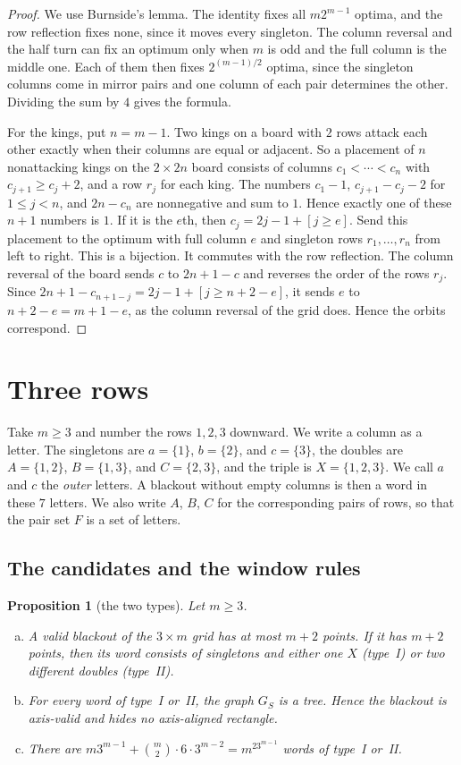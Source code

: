 \documentclass[12pt]{article}
\theoremstyle{plain}
\newtheorem{proposition}[theorem]{Proposition}
\theoremstyle{definition}
\theoremstyle{remark}
\begin{document}
\begin{proof}
We use Burnside's lemma. The identity fixes all $m2^{m-1}$ optima, and the row
reflection fixes none, since it moves every singleton. The column reversal and
the half turn can fix an optimum only when $m$ is odd and the full column is
the middle one. Each of them then fixes $2^{(m-1)/2}$ optima, since the
singleton columns come in mirror pairs and one column of each pair determines
the other. Dividing the sum by $4$ gives the formula.

For the kings, put $n=m-1$. Two kings on a board with $2$ rows attack each other
exactly when their columns are equal or adjacent. So a placement of $n$
nonattacking kings on the $2\times2n$ board consists of columns
$c_1<\cdots<c_n$ with $c_{j+1}\ge c_j+2$, and a row $r_j$ for each king. The
numbers $c_1-1$, $c_{j+1}-c_j-2$ for $1\le j<n$, and $2n-c_n$ are nonnegative and
sum to $1$. Hence exactly one of these $n+1$ numbers is $1$. If it is the $e$th,
then $c_j=2j-1+[j\ge e]$. Send this placement to the optimum with full column
$e$ and singleton rows $r_1,\ldots,r_n$ from left to right. This is a bijection.
It commutes with the row reflection. The column reversal of the board sends
$c$ to $2n+1-c$ and reverses the order of the rows $r_j$. Since
$2n+1-c_{n+1-j}=2j-1+[j\ge n+2-e]$, it sends $e$ to $n+2-e=m+1-e$, as the column
reversal of the grid does. Hence the orbits correspond.
\end{proof}
\section{Three rows}\label{sec:three}

Take $m\ge3$ and number the rows $1,2,3$ downward. We write a column as a
letter. The singletons are $a=\{1\}$, $b=\{2\}$, and $c=\{3\}$, the doubles are
$A=\{1,2\}$, $B=\{1,3\}$, and $C=\{2,3\}$, and the triple is $X=\{1,2,3\}$. We
call $a$ and $c$ the \emph{outer} letters. A blackout without empty columns is
then a word in these $7$ letters. We also write $A$, $B$, $C$ for the
corresponding pairs of rows, so that the pair set $F$ is a set of letters.

\subsection{The candidates and the window rules}

\begin{proposition}[the two types]\label{prop:threeclass}
Let $m\ge3$.
\begin{enumerate}[(a)]
\item A valid blackout of the $3\times m$ grid has at most $m+2$ points. If it has
$m+2$ points, then its word consists of singletons and either one $X$
\textup{(type~I)} or two different doubles \textup{(type~II)}.
\item For every word of type~I or~II, the graph $G_S$ is a tree. Hence the
blackout is axis-valid and hides no axis-aligned rectangle.
\item There are $m3^{m-1}+\binom m2\cdot6\cdot3^{m-2}=m^23^{m-1}$ words of type~I
or~II.
\end{enumerate}
\end{proposition}
\end{document}

